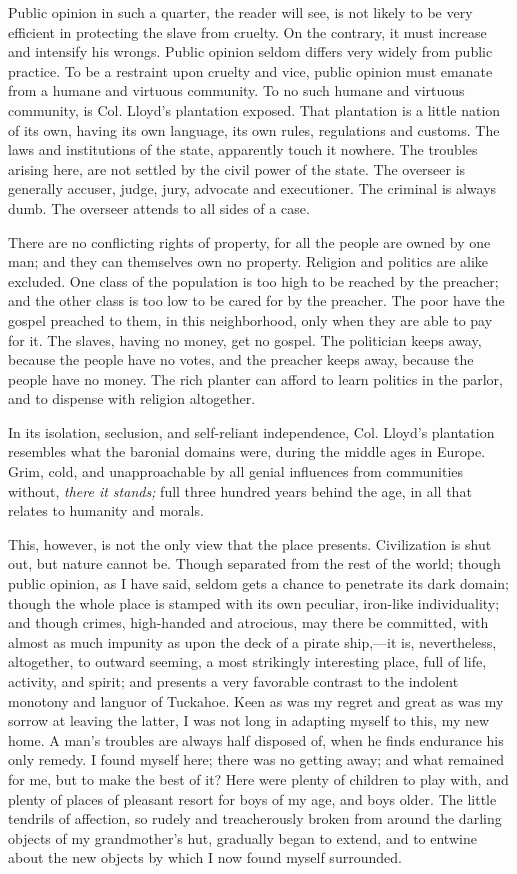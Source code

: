 Public opinion in such a quarter, the reader will see, is not likely to
be very efficient in protecting the slave from cruelty. On the contrary,
it must increase and intensify his wrongs. Public opinion seldom differs
very widely from public practice. To be a restraint upon cruelty and
vice, public opinion must emanate from a humane and virtuous community.
To no such {}humane and virtuous community, is Col. Lloyd's plantation
exposed. That plantation is a little nation of its own, having its own
language, its own rules, regulations and customs. The laws and
institutions of the state, apparently touch it nowhere. The troubles
arising here, are not settled by the civil power of the state. The
overseer is generally accuser, judge, jury, advocate and executioner.
The criminal is always dumb. The overseer attends to all sides of a
case.

There are no conflicting rights of property, for all the people are
owned by one man; and they can themselves own no property. Religion and
politics are alike excluded. One class of the population is too high to
be reached by the preacher; and the other class is too low to be cared
for by the preacher. The poor have the gospel preached to them, in this
neighborhood, only when they are able to pay for it. The slaves, having
no money, get no gospel. The politician keeps away, because the people
have no votes, and the preacher keeps away, because the people have no
money. The rich planter can afford to learn politics in the parlor, and
to dispense with religion altogether.

In its isolation, seclusion, and self-reliant independence, Col. Lloyd's
plantation resembles what the baronial domains were, during the middle
ages in Europe. Grim, cold, and unapproachable by all genial influences
from communities without, \emph{there it stands;} full three hundred
years behind the age, in all that relates to humanity and morals.

This, however, is not the only view that the place presents.
Civilization is shut out, but nature cannot be. Though separated from
the rest of the world; {}though public opinion, as I have said, seldom
gets a chance to penetrate its dark domain; though the whole place is
stamped with its own peculiar, iron-like individuality; and though
crimes, high-handed and atrocious, may there be committed, with almost
as much impunity as upon the deck of a pirate ship,---it is,
nevertheless, altogether, to outward seeming, a most strikingly
interesting place, full of life, activity, and spirit; and presents a
very favorable contrast to the indolent monotony and languor of
Tuckahoe. Keen as was my regret and great as was my sorrow at leaving
the latter, I was not long in adapting myself to this, my new home. A
man's troubles are always half disposed of, when he finds endurance his
only remedy. I found myself here; there was no getting away; and what
remained for me, but to make the best of it? Here were plenty of
children to play with, and plenty of places of pleasant resort for boys
of my age, and boys older. The little tendrils of affection, so rudely
and treacherously broken from around the darling objects of my
grandmother's hut, gradually began to extend, and to entwine about the
new objects by which I now found myself surrounded.

